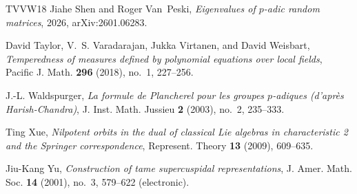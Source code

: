 \documentclass[11pt,reqno]{amsart}
\numberwithin{equation}{section}
\theoremstyle{plain}
\theoremstyle{definition}
\theoremstyle{remark}
\theoremstyle{plain}
\begin{document}
\begin{thebibliography}{TVVW18}
Jiahe Shen and Roger Van~Peski, \emph{Eigenvalues of {$p$}-adic random
  matrices}, 2026, arXiv:2601.06283.

David Taylor, V.~S. Varadarajan, Jukka Virtanen, and David Weisbart,
  \emph{Temperedness of measures defined by polynomial equations over local
  fields}, Pacific J. Math. \textbf{296} (2018), no.~1, 227--256. 

J.-L. Waldspurger, \emph{La formule de {P}lancherel pour les groupes
  {$p$}-adiques (d'apr\`es {H}arish-{C}handra)}, J. Inst. Math. Jussieu
  \textbf{2} (2003), no.~2, 235--333. 

Ting Xue, \emph{Nilpotent orbits in the dual of classical {L}ie algebras in
  characteristic 2 and the {S}pringer correspondence}, Represent. Theory
  \textbf{13} (2009), 609--635. 

Jiu-Kang Yu, \emph{Construction of tame supercuspidal representations}, J.
  Amer. Math. Soc. \textbf{14} (2001), no.~3, 579--622 (electronic).

\end{thebibliography}
\end{document}
